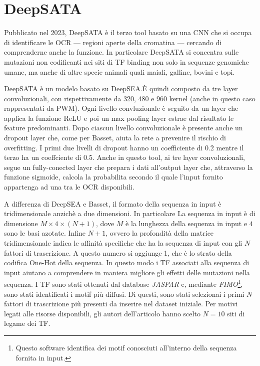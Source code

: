 \section{DeepSATA}\label{sec:DeepSATA}
% 
Pubblicato nel 2023, DeepSATA è il terzo tool basato su una \acs{CNN} che si occupa di identificare le \acs{OCR} — regioni aperte della cromatina — cercando di comprenderne anche la funzione. In particolare DeepSATA si concentra sulle mutazioni non codificanti nei siti di \acs{TF} binding non solo in sequenze genomiche umane, ma anche di altre specie animali quali maiali, galline, bovini e topi.

DeepSATA è un modelo basato su DeepSEA.\@ È quindi composto da tre layer convoluzionali, con rispettivamente da 320, 480 e 960 kernel (anche in questo caso rappresentati da \acs{PWM}). Ogni livello convluzionale è seguito da un layer che applica la funzione \acs{ReLU} e poi un max pooling layer estrae dal risultato le feature predominanti. Dopo ciascun livello convoluzionale è presente anche un dropout layer che, come per Basset, aiuta la rete a prevenire il rischio di overfitting. I primi due livelli di dropout hanno un coefficiente di 0.2 mentre il terzo ha un coeffciente di 0.5. Anche in questo tool, ai tre layer convoluzionali, segue un fully-conected layer che prepara i dati all'output layer che, attraverso la funzione sigmoide, calcola la probabilita secondo il quale l'input fornito appartenga ad una tra le \acs{OCR} disponibili.

A differenza di DeepSEA e Basset, il formato della sequenza in input è tridimensionale anzichè a due dimensioni. In particolare La sequenza in input è di dimensione $M \times 4 \times (N + 1)$, dove $M$ è la lunghezza della sequenza in input e $4$ sono le basi azotate. Infine $N + 1$, ovvero la profondità della matrice tridimensionale indica le affinità specifiche che ha la sequenza di input con gli $N$ fattori di trascrizione. A questo numero si aggiunge 1, che è lo strato della codifica One-Hot della sequenza. In questo modo i \acs{TF} associati alla sequenza di input aiutano a comprendere in maniera migliore gli effetti delle mutazioni nella sequenza. I \acs{TF} sono stati ottenuti dal database \textsl{JASPAR} e, mediante \textsl{FIMO}\footnote{Questo software identifica dei motif conosciuti all'interno della sequenza fornita in input.}, sono stati identificati i motif più diffusi. Di questi, sono stati selezionai i primi $N$ fattori di trascrizione più presenti da inserire nel dataset iniziale. Per motivi legati alle risorse disponibili, gli autori dell'articolo hanno scelto $N=10$ siti di legame dei \acs{TF}. 

